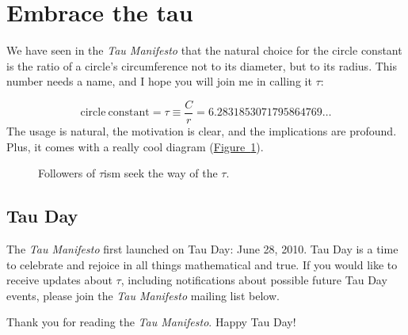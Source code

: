 \documentclass{article}
\begin{document}

\section{Embrace the tau}
\label{sec:embrace_the_tau}

We have seen in the \emph{Tau Manifesto} that the natural choice for the circle constant is the ratio of a circle's circumference not to its diameter, but to its radius. This number needs a name, and I hope you will join me in calling it $\tau$:

\[
  \mathrm{circle\ constant} = \tau \equiv \frac{C}{r} = 6.2831853071795864769\ldots
\]
The usage is natural, the motivation is clear, and the implications are profound. Plus, it comes with a really cool diagram (\hyperref[fig:tauism]{Figure~}\ref{fig:tauism}).

\begin{figure}
\begin{center}
\end{center}
\caption{Followers of $\tau$ism seek the way of the $\tau$.\label{fig:tauism}}
\end{figure}

  \subsection{Tau Day} %
  \label{sec:tau_day}
  

The \emph{Tau Manifesto} first launched on Tau Day: June 28, 2010. Tau Day is a time to celebrate and rejoice in all things mathematical and true. If you would like to receive updates about $\tau$, including notifications about possible future Tau Day events, please join the \emph{Tau Manifesto} mailing list below.

Thank you for reading the \emph{Tau Manifesto}. Happy Tau Day!






\end{document}
